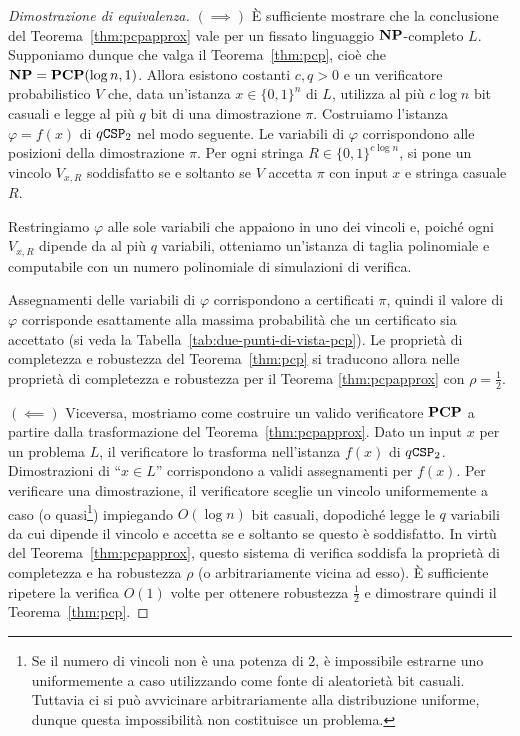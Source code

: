 \begin{proof}[Dimostrazione di equivalenza]
	$(\implies)$
	È sufficiente mostrare che la conclusione del Teorema~\ref{thm:pcpapprox}
	vale per un fissato linguaggio $\mathbf{NP}$-completo $L$.
	Supponiamo dunque che valga il Teorema~\ref{thm:pcp}, cioè che
	$\mathbf{NP} = \mathbf{PCP}(\log n, 1)$. Allora esistono costanti $c, q > 0$ e un
	verificatore probabilistico $V$ che, data un'istanza $x \in \{0, 1\}^n$ di
	$L$, utilizza al più $c \log n$ bit casuali e legge al più $q$ bit
	di una dimostrazione $\pi$.
	Costruiamo l'istanza $\varphi = f(x)$ di $q\mathtt{CSP}_2$ nel modo seguente.
	Le variabili di $\varphi$ corrispondono alle posizioni della dimostrazione
	$\pi$.
	Per ogni stringa $R \in \{0, 1\}^{c \log n}$, si pone un vincolo $V_{x,R}$
	soddisfatto se e soltanto se $V$ accetta $\pi$ con input $x$ e stringa
	casuale $R$.
	
	Restringiamo $\varphi$ alle sole variabili che appaiono in uno dei vincoli
	e, poiché ogni $V_{x, R}$ dipende da al più $q$ variabili, otteniamo
	un'istanza di taglia polinomiale e computabile con un numero polinomiale di
	simulazioni di verifica.

	Assegnamenti delle variabili di $\varphi$ corrispondono a certificati
	$\pi$, quindi il valore di $\varphi$ corrisponde esattamente alla massima
	probabilità che un certificato sia accettato (si veda la
	Tabella~\ref{tab:due-punti-di-vista-pcp}).
	Le proprietà di completezza e robustezza del Teorema~\ref{thm:pcp} si
	traducono allora nelle proprietà di completezza e robustezza per il Teorema
	\ref{thm:pcpapprox} con $\rho = \frac12$.

	$(\impliedby)$
	Viceversa, mostriamo come costruire un valido verificatore $\mathbf{PCP}$ a partire
	dalla trasformazione del Teorema~\ref{thm:pcpapprox}.
	Dato un input $x$ per un problema $L$, il verificatore lo trasforma
	nell'istanza $f(x)$ di $q\mathtt{CSP}_2$.
	Dimostrazioni di ``$x \in L$'' corrispondono a validi
	assegnamenti per $f(x)$. Per verificare una dimostrazione, il verificatore
	sceglie un vincolo uniformemente a caso (o quasi\footnote{Se il numero di
	vincoli non è una potenza di $2$, è impossibile estrarne uno uniformemente a
	caso utilizzando come fonte di aleatorietà bit casuali. Tuttavia ci si può
	avvicinare arbitrariamente alla distribuzione uniforme, dunque
	questa impossibilità non costituisce un problema.}) impiegando $O(\log n)$
	bit casuali, dopodiché legge le $q$ variabili da cui dipende il vincolo e
	accetta se e soltanto se questo è soddisfatto.
	In virtù del Teorema~\ref{thm:pcpapprox}, questo sistema di verifica
	soddisfa la proprietà di completezza e ha
	robustezza $\rho$ (o arbitrariamente vicina ad esso).
	È sufficiente ripetere la verifica $O(1)$ volte per ottenere robustezza
	$\frac12$ e dimostrare quindi il Teorema~\ref{thm:pcp}.
\end{proof}

